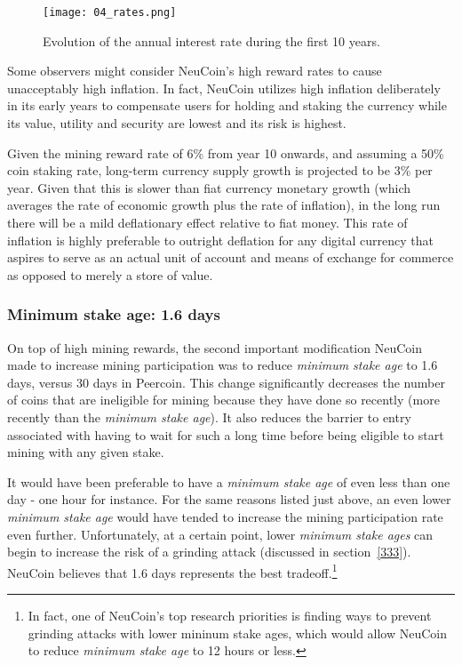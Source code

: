 \documentclass[a4paper,11pt]{article}
\begin{document}
\begin{figure}[H]
\centering
\texttt{[image: 04\_rates.png]}
\caption{Evolution of the annual interest rate during the first 10 years.}
\end{figure}


Some observers might consider NeuCoin's high reward rates to cause unacceptably high inflation. In fact, NeuCoin utilizes high inflation deliberately in its early years to compensate users for holding and staking the currency while its value, utility and security are lowest and its risk is highest.

Given the mining reward rate of 6\% from year 10 onwards, and assuming a 50\% coin staking rate, long-term currency supply growth is projected to be 3\% per year. Given that this is slower than fiat currency monetary growth (which averages the rate of economic growth plus the rate of inflation), in the long run there will be a mild deflationary effect relative to fiat money. This rate of inflation is highly preferable to outright deflation for any digital currency that aspires to serve as an actual unit of account and means of exchange for commerce as opposed to merely a store of value.

\subsubsection*{Minimum stake age: 1.6 days}

On top of high mining rewards, the second important modification NeuCoin made to increase mining participation was to reduce \textit{minimum stake age} to 1.6 days, versus 30 days in Peercoin. This change significantly decreases the number of coins that are ineligible for mining because they have done so recently (more recently than the \textit{minimum stake age}). It also reduces the barrier to entry associated with having to wait for such a long time before being eligible to start mining with any given stake.

It would have been preferable to have a \textit{minimum stake age} of even less than one day - one hour for instance. For the same reasons listed just above, an even lower \textit{minimum stake age} would have tended to increase the mining participation rate even further. Unfortunately, at a certain point, lower \textit{minimum stake ages} can begin to increase the risk of a grinding attack (discussed in section~\ref{333}). NeuCoin believes that 1.6 days represents the best tradeoff.\footnote{In fact, one of NeuCoin's top research priorities is finding ways to prevent grinding attacks with lower mininum stake ages, which would allow NeuCoin to reduce \textit{minimum stake age} to 12 hours or less.}
\end{document}
